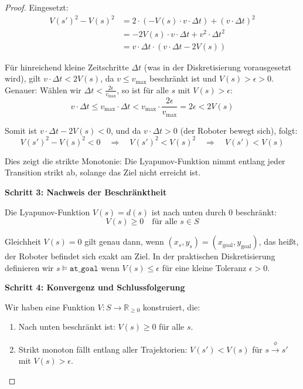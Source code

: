 ﻿\documentclass[a4paper,12pt]{article}
\theoremstyle{definition}
\begin{document}
\begin{proof}
Eingesetzt:
\begin{align}
V(s')^2 - V(s)^2 &= 2 \cdot (-V(s) \cdot v \cdot \Delta t) + (v \cdot \Delta t)^2 \\
&= -2 V(s) \cdot v \cdot \Delta t + v^2 \cdot \Delta t^2 \\
&= v \cdot \Delta t \cdot (v \cdot \Delta t - 2 V(s))
\end{align}

Für hinreichend kleine Zeitschritte $\Delta t$ (was in der Diskretisierung vorausgesetzt wird), gilt $v \cdot \Delta t < 2 V(s)$, da $v \leq v_{\max}$ beschränkt ist und $V(s) > \epsilon > 0$. Genauer: Wählen wir $\Delta t < \frac{2\epsilon}{v_{\max}}$, so ist für alle $s$ mit $V(s) > \epsilon$:
\begin{equation}
v \cdot \Delta t \leq v_{\max} \cdot \Delta t < v_{\max} \cdot \frac{2\epsilon}{v_{\max}} = 2\epsilon < 2V(s)
\end{equation}

Somit ist $v \cdot \Delta t - 2V(s) < 0$, und da $v \cdot \Delta t > 0$ (der Roboter bewegt sich), folgt:
\begin{equation}
V(s')^2 - V(s)^2 < 0 \quad \Rightarrow \quad V(s')^2 < V(s)^2 \quad \Rightarrow \quad V(s') < V(s)
\end{equation}

Dies zeigt die strikte Monotonie: Die Lyapunov-Funktion nimmt entlang jeder Transition strikt ab, solange das Ziel nicht erreicht ist.

\textbf{Schritt 3: Nachweis der Beschränktheit}

Die Lyapunov-Funktion $V(s) = d(s)$ ist nach unten durch 0 beschränkt:
\begin{equation}
V(s) \geq 0 \quad \text{für alle } s \in S
\end{equation}

Gleichheit $V(s) = 0$ gilt genau dann, wenn $(x_s, y_s) = (x_{\text{goal}}, y_{\text{goal}})$, das heißt, der Roboter befindet sich exakt am Ziel. In der praktischen Diskretisierung definieren wir $s \models \texttt{at\_goal}$ wenn $V(s) \leq \epsilon$ für eine kleine Toleranz $\epsilon > 0$.

\textbf{Schritt 4: Konvergenz und Schlussfolgerung}

Wir haben eine Funktion $V: S \to \mathbb{R}_{\geq 0}$ konstruiert, die:
\begin{enumerate}
\item Nach unten beschränkt ist: $V(s) \geq 0$ für alle $s$.
\item Strikt monoton fällt entlang aller Trajektorien: $V(s') < V(s)$ für $s \xrightarrow{\phi} s'$ mit $V(s) > \epsilon$.
\end{enumerate}


\end{proof}
\end{document}
